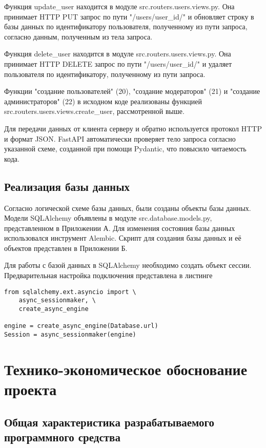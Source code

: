 \documentclass[14pt]{extarticle}
\newcounter{listing}[section]
\begin{document}
Функция update\_user находится в модуле src.routers.users.views.py. Она принимает HTTP PUT запрос по пути "/users/{user\_id}/" и обновляет строку в базы данных по идентификатору пользователя, полученному из пути запроса, согласно данным, полученным из тела запроса.

Функция delete\_user находится в модуле src.routers.users.views.py. Она принимает HTTP DELETE запрос по пути "/users/{user\_id}/" и удаляет пользователя по идентификатору, полученному из пути запроса.

Функции "создание пользователей" (20), "создание модераторов" (21) и "создание администраторов" (22) в исходном коде реализованы функцией src.routers.users.views.create\_user, рассмотренной выше.

Для передачи данных от клиента серверу и обратно используется протокол HTTP и формат JSON. FastAPI автоматически проверяет тело запроса согласно указанной схеме, созданной при помощи Pydantic, что повысило читаемость кода.

\subsection{Реализация базы данных}

Согласно логической схеме базы данных, были созданы объекты базы данных. Модели SQLAlchemy объявлены в модуле src.database.models.py, представленном в Приложении А. Для изменения состояния базы данных использовался инструмент Alembic. Скрипт для создания базы данных и её объектов представлен в Приложении Б.

Для работы с базой данных в SQLAlchemy необходимо создать объект сессии. Предварительная настройка подключения представлена в листинге

\begin{lstlisting}[caption={Настройка подключения к базе данных \label{listing:db_connection}}]
from sqlalchemy.ext.asyncio import \
    async_sessionmaker, \
    create_async_engine
    
engine = create_async_engine(Database.url)
Session = async_sessionmaker(engine)
\end{lstlisting}

\clearpage
\section{Технико-экономическое обоснование проекта}
\subsection{Общая характеристика разрабатываемого программного средства}
\end{document}

